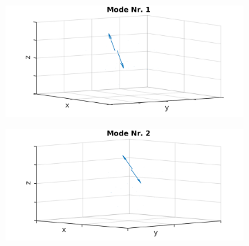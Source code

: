             \begin{figure}[!t]
              \centering
              \begin{subfigure}[t]{0.325\textwidth}
                \centering
                \includegraphics[width=\textwidth,height=0.7\textwidth]{figs/auswertung/manipulation/dipol3HzModeNr1.png}
              \end{subfigure}
              \begin{subfigure}[t]{0.325\textwidth}
                \centering
                \includegraphics[width=\textwidth,height=0.7\textwidth]{figs/auswertung/manipulation/dipol3HzModeNr2.png}
              \end{subfigure}
              \begin{subfigure}[t]{0.325\textwidth}
                \centering

\end{subfigure}
\end{figure}
